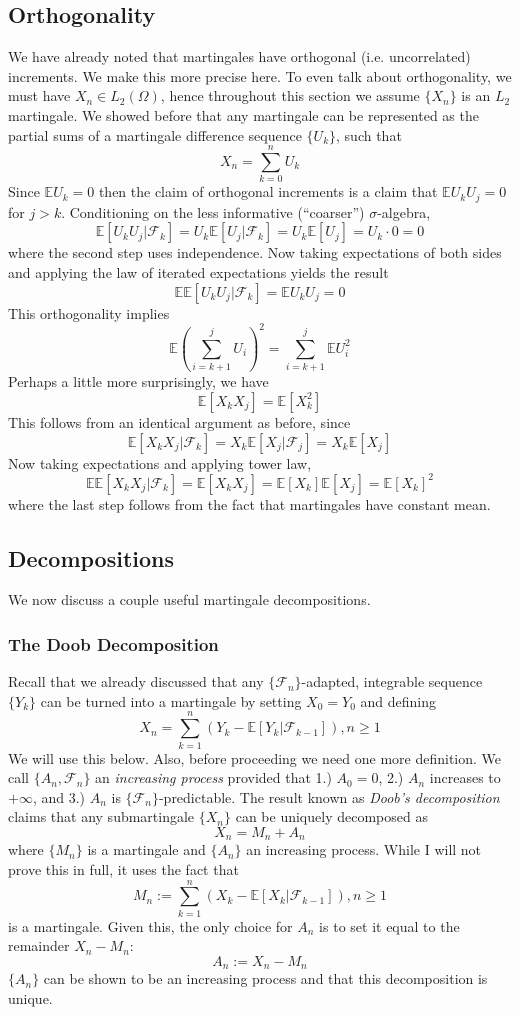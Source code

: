\documentclass[12pt]{article}
\newcommand{\E}{\mathbb{E}}
\begin{document}
\subsection{Orthogonality}
We have already noted that martingales have orthogonal (i.e. uncorrelated) increments. We make this more precise here. To even talk about orthogonality, we must 
have $X_n \in L_2(\Omega)$, hence throughout this section we assume $\{X_n\}$ is an $L_2$ martingale. We showed before that any martingale can be represented 
as the partial sums of a martingale difference sequence $\{U_k\}$, such that 
\[X_n = \sum_{k = 0}^{n} U_k\]
Since $\E U_k = 0$ then the claim of orthogonal increments is a claim that $\E U_k U_j = 0$ for $j > k$. Conditioning on the less informative (``coarser'') $\sigma$-algebra, 
\[\E[U_k U_j | \mathcal{F}_k] = U_k \E[U_j | \mathcal{F}_k] = U_k \E[U_j] = U_k \cdot 0 = 0\]
where the second step uses independence. Now taking expectations of both sides and applying the law of iterated expectations yields the result 
\[\E \E[U_k U_j|\mathcal{F}_k] = \E U_k U_j = 0\]
This orthogonality implies 
\[\E \left(\sum_{i = k + 1}^{j} U_i \right)^2 = \sum_{i = k + 1}^{j} \E U_i^2\]
Perhaps a little more surprisingly, we have 
\[\E[X_k X_j] = \E[X_k^2]\]
This follows from an identical argument as before, since
\[\E[X_k X_j | \mathcal{F}_k] = X_k \E[X_j | \mathcal{F}_j] = X_k \E[X_j]\]
Now taking expectations and applying tower law, 
\[\E \E[X_k X_j | \mathcal{F}_k]  = \E[X_k X_j] = \E[X_k] \E[X_j] = \E[X_k]^2\]
where the last step follows from the fact that martingales have constant mean. 

\subsection{Decompositions}
We now discuss a couple useful martingale decompositions. 

\subsubsection{The Doob Decomposition}
Recall that we already discussed that any $\{\mathcal{F}_n\}$-adapted, integrable sequence $\{Y_k\}$ can be turned into a martingale by 
setting $X_0 = Y_0$ and defining 
\[X_n = \sum_{k = 1}^{n} \left(Y_k - \E[Y_k|\mathcal{F}_{k-1}] \right), n \geq 1\]
We will use this below. Also, before proceeding we need one more definition. We call $\{A_n, \mathcal{F}_n\}$ an \textit{increasing process} provided that 1.) $A_0 = 0$, 2.) $A_n$ increases to 
$+\infty$, and 3.) $A_n$ is $\{\mathcal{F}_n\}$-predictable. The result known as \textit{Doob's decomposition} claims that any submartingale $\{X_n\}$ can be uniquely decomposed as 
\[X_n = M_n + A_n\]
where $\{M_n\}$ is a martingale and $\{A_n\}$ an increasing process. While I will not prove this in full, it uses the fact that 
\[M_n := \sum_{k = 1}^{n} \left(X_k - \E[X_k|\mathcal{F}_{k-1}] \right), n \geq 1\]
is a martingale. Given this, the only choice for $A_n$ is to set it equal to the remainder $X_n - M_n$:
\[A_n := X_n - M_n\]
$\{A_n\}$ can be shown to be an increasing process and that this decomposition is unique. 
\end{document}
